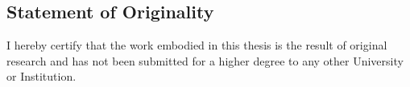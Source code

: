 
\begin{center}
\chapter*{Statement of Originality}
\end{center}

I hereby certify that the work embodied in this thesis is the result of original research and has not been submitted for a higher degree to any other University or Institution.



